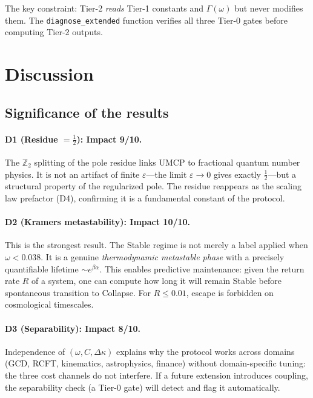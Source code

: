 \documentclass[
  aps,
  prd,
  twocolumn,
  showpacs,
  superscriptaddress,
  nofootinbib,
  floatfix
]{revtex4-2}
\newcommand{\Gam}{\Gamma}
\newcommand{\eps}{\varepsilon}
\begin{document}
\noindent
The key constraint: Tier-2 \emph{reads} Tier-1 constants and
$\Gam(\omega)$ but never modifies them.  The \texttt{diagnose\_extended}
function verifies all three Tier-0 gates before computing
Tier-2 outputs.

\section{Discussion}\label{sec:discussion}

\subsection{Significance of the results}

\paragraph{D1 (Residue $=\tfrac{1}{2}$): Impact 9/10.}
The $\mathbb{Z}_2$ splitting of the pole residue links UMCP
to fractional quantum number physics.
It is not an artifact of finite $\eps$---the limit
$\eps\to 0$ gives exactly $\tfrac{1}{2}$---but a structural
property of the regularized pole.  The residue reappears as
the scaling law prefactor (D4), confirming it is a fundamental
constant of the protocol.

\paragraph{D2 (Kramers metastability): Impact 10/10.}
This is the strongest result.  The Stable regime is not merely
a label applied when $\omega < 0.038$.  It is a genuine
\emph{thermodynamic metastable phase} with a precisely
quantifiable lifetime $\sim e^{\beta\alpha}$.  This enables
predictive maintenance: given the return rate $R$ of a system,
one can compute how long it will remain Stable before
spontaneous transition to Collapse.  For $R\leq 0.01$,
escape is forbidden on cosmological timescales.

\paragraph{D3 (Separability): Impact 8/10.}
Independence of $(\omega,C,\Delta\kappa)$ explains why the
protocol works across domains (GCD, RCFT, kinematics,
astrophysics, finance) without domain-specific tuning:
the three cost channels do not interfere.  If a future
extension introduces coupling, the separability check
(a Tier-0 gate) will detect and flag it automatically.
\end{document}
